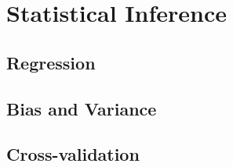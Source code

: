 \section{Statistical Inference} \label{sec:bt_StatisticalInference}

\subsection{Regression}
\subsection{Bias and Variance}
\subsection{Cross-validation}